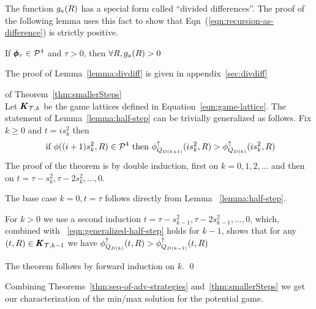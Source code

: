 \documentclass{article}[12pt]
\begin{document}
The function $g_a(R)$ has a special form called ``divided
differences''. The proof of the following lemma uses this fact to show that 
Eqn~(\ref{eqn:recursion-as-difference}) is strictly positive.
\begin{lemma} \label{lemma:divdiff}
If $\pmb{\phi}_{\tau} \in {\cal P}^{4}$ and $\tau>0$, then $\forall R, g_a(R)>0$
\end{lemma}
The proof of Lemma~\ref{lemma:divdiff} is given in appendix~\ref{sec:divdiff}

\proof  of Theorem~\ref{thm:smallerSteps} \\

Let $ \pmb{K}_{{\mathcal{T},k}}$ be the game lattices defined in
Equation~\ref{eqn:game-lattice}. The statement of
Lemma~\ref{lemma:half-step} can be trivially generalized as follows. Fix $k\geq 0$ and $t=i s_k^2$
then 
\begin{equation} \label{eqn:generalized-half-step}
  \mbox{ if } \phi((i+1) s_k^2,R) \in {\cal P}^{4} \mbox{ then }
  \phi_{Q_{D(k+1)}}^{\uparrow}(i s_k^2,R) >  \phi_{Q_{D(k)}}^{\uparrow}(i s_k^2,R)
\end{equation}
The proof of the theorem is by double induction, first on $k=0,1,2,\ldots$ and then on
$t=\tau-s_k^2,\tau-2s_k^2,\ldots,0$.

The base case $k=0,t=\tau$ follows directly from Lemma ~\ref{lemma:half-step}.

For $k>0$ we use a second induction $t=\tau-s_{k-1}^2,\tau-2s_{k-1}^2,\ldots,0$, which, combined with 
~\ref{eqn:generalized-half-step} holds for $k-1$, shows that for any $(t,R) \in \pmb{K}_{{\mathcal{T},k-1}}$
we have $ \phi_{Q_{D(k)}}^{\uparrow}(t,R) >  \phi_{Q_{D(k-1)}}^{\uparrow}(t,R)$


The theorem follows by forward induction on $k$.
\qed

Combining Theorems~\ref{thm:seq-of-adv-strategies}
and~\ref{thm:smallerSteps} we get our characterization of the min/max
solution for the potential game.
\end{document}
